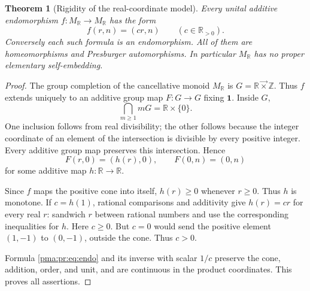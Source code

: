 \documentclass[11pt]{article}
\numberwithin{equation}{section}
\newtheorem{theorem}{Theorem}[section]
\theoremstyle{definition}
\theoremstyle{remark}
\newcommand{\Z}{\mathbb Z}
\newcommand{\R}{\mathbb R}
\newcommand{\lex}{\mathbin{\overrightarrow\times}}
\newcommand{\MR}{M_{\R}}
\newcommand{\one}{\mathbf 1}
\begin{document}
\begin{theorem}[Rigidity of the real-coordinate model]
\label{pma:pr:thm:realendos}\label{pma:pr:thm:realembeddings}
Every unital additive endomorphism $f:\MR\to\MR$ has the form
\begin{equation}
 f(r,n)=(cr,n)\qquad(c\in\R_{>0}).
 \label{pma:pr:eq:endo}
\end{equation}
Conversely each such formula is an endomorphism. All of them are
homeomorphisms and Presburger automorphisms. In particular $\MR$ has no
proper elementary self-embedding.
\end{theorem}
\begin{proof}
The group completion of the cancellative monoid $\MR$ is
$G=\R\lex\Z$. Thus $f$ extends uniquely to an additive group map
$F:G\to G$ fixing $\one$. Inside $G$,
\[
 \bigcap_{m\geq1}mG=\R\times\{0\}.
\]
One inclusion follows from real divisibility; the other follows because
the integer coordinate of an element of the intersection is divisible
by every positive integer. Every additive group map preserves this
intersection. Hence
\[
 F(r,0)=(h(r),0),\qquad F(0,n)=(0,n)
\]
for some additive map $h:\R\to\R$.

Since $f$ maps the positive cone into itself, $h(r)\geq0$ whenever
$r\geq0$. Thus $h$ is monotone. If $c=h(1)$, rational comparisons and
additivity give $h(r)=cr$ for every real $r$: sandwich $r$ between
rational numbers and use the corresponding inequalities for $h$.
Here $c\geq0$. But $c=0$ would send the positive element $(1,-1)$ to
$(0,-1)$, outside the cone. Thus $c>0$.

Formula \eqref{pma:pr:eq:endo} and its inverse with scalar $1/c$ preserve the
cone, addition, order, and unit, and are continuous in the product
coordinates. This proves all assertions.
\end{proof}
\end{document}
